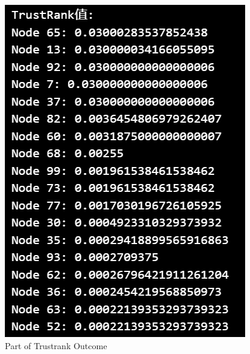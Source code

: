 \documentclass{article}
\begin{document}
	\begin{figure}[H]
		\centering
		\includegraphics[scale=0.5]{trustrank.png}
		\caption{Part of Trustrank Outcome}
	\end{figure}
	
\end{document}
